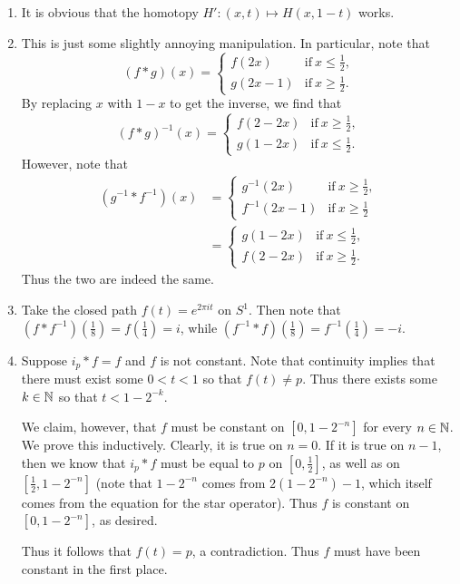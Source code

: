 \documentclass[../../solutions.tex]{subfiles}
\begin{document}
\begin{exercise} \leavevmode
\begin{enumerate}
\item It is obvious that the homotopy $H':(x,t)\mapsto H(x,1-t)$ works. 

\item This is just some slightly annoying manipulation. In particular, note that \[(f*g)(x)=\begin{cases}f(2x)&\text{if}~x\le\frac12,\\g(2x-1)&\text{if}~x\ge\frac12.\end{cases}\] By replacing $x$ with $1-x$ to get the inverse, we find that \[(f*g)^{-1}(x)=\begin{cases}f(2-2x)&\text{if}~x\ge\frac12,\\g(1-2x)&\text{if}~x\le\frac12.\end{cases}\] However, note that \begin{align*}(g^{-1}*f^{-1})(x)&=\begin{cases}g^{-1}(2x)&\text{if}~x\ge\frac12,\\f^{-1}(2x-1)&\text{if}~x\ge\frac12\end{cases}\\&=\begin{cases}g(1-2x)&\text{if}~x\le\frac12,\\f(2-2x)&\text{if}~x\ge\frac12.\end{cases}\end{align*} Thus the two are indeed the same. 

\item Take the closed path $f(t)=e^{2\pi it}$ on $S^1$. Then note that $(f*f^{-1})(\frac18)=f(\frac14)=i$, while $(f^{-1}*f)(\frac18)=f^{-1}(\frac14)=-i$. 

\item Suppose $i_p*f=f$ and $f$ is not constant. Note that continuity implies that there must exist some $0<t<1$ so that $f(t)\ne p$. Thus there exists some $k\in\mathbb{N}$ so that $t<1-2^{-k}$. 

We claim, however, that $f$ must be constant on $[0,1-2^{-n}]$ for every $n\in\mathbb{N}$. We prove this inductively. Clearly, it is true on $n=0$. If it is true on $n-1$, then we know that $i_p*f$ must be equal to $p$ on $[0,\frac12]$, as well as on $[\frac12,1-2^{-n}]$ (note that $1-2^{-n}$ comes from $2(1-2^{-n})-1$, which itself comes from the equation for the star operator). Thus $f$ is constant on $[0,1-2^{-n}]$, as desired. 

Thus it follows that $f(t)=p$, a contradiction. Thus $f$ must have been constant in the first place. 
\end{enumerate} 
\end{exercise} 

\begin{exercise} \leavevmode

\end{exercise} 
\end{document}
